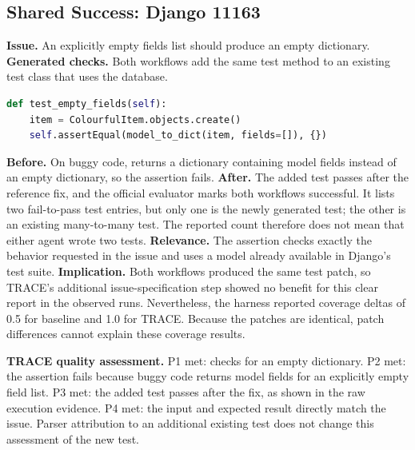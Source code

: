 \subsection{Shared Success: Django 11163}
\textbf{Issue.} An explicitly empty fields list should produce an empty dictionary. \textbf{Generated checks.} Both workflows add the same test method to an existing test class that uses the database.
\begin{lstlisting}[language=Python,caption={Identical submitted Django 11163 addition.}]
def test_empty_fields(self):
    item = ColourfulItem.objects.create()
    self.assertEqual(model_to_dict(item, fields=[]), {})
\end{lstlisting}
\textbf{Before.} On buggy code,  returns a dictionary containing model fields instead of an empty dictionary, so the assertion fails. \textbf{After.} The added test passes after the reference fix, and the official evaluator marks both workflows successful. It lists two fail-to-pass test entries, but only one is the newly generated test; the other is an existing many-to-many test. The reported count therefore does not mean that either agent wrote two tests. \textbf{Relevance.} The assertion checks exactly the behavior requested in the issue and uses a model already available in Django's test suite. \textbf{Implication.} Both workflows produced the same test patch, so TRACE's additional issue-specification step showed no benefit for this clear report in the observed runs. Nevertheless, the harness reported coverage deltas of 0.5 for baseline and 1.0 for TRACE. Because the patches are identical, patch differences cannot explain these coverage results.

\textbf{TRACE quality assessment.} P1 met:  checks for an empty dictionary. P2 met: the assertion fails because buggy code returns model fields for an explicitly empty field list. P3 met: the added test passes after the fix, as shown in the raw execution evidence. P4 met: the input and expected result directly match the issue. Parser attribution to an additional existing test does not change this assessment of the new test.

